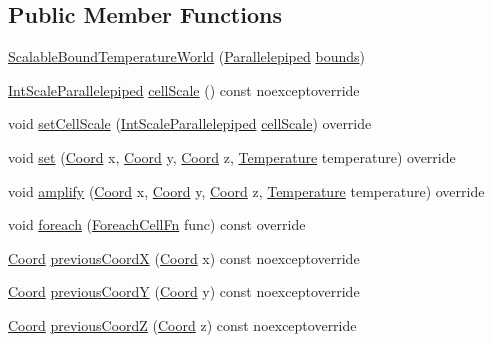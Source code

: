 \subsection*{Public Member Functions}
\begin{DoxyCompactItemize}
\item 
\hyperlink{class_scalable_bound_temperature_world_a70e95f32bc19f298649ac99d0b69068c}{Scalable\-Bound\-Temperature\-World} (\hyperlink{struct_parallelepiped}{Parallelepiped} \hyperlink{class_bound_temperature_world_a3351693a7d184365da5dfb5d833a0cb6}{bounds})
\item 
\hyperlink{struct_int_scale_parallelepiped}{Int\-Scale\-Parallelepiped} \hyperlink{class_scalable_bound_temperature_world_a9ac7291c4a2ff3d60042c518f1ae2858}{cell\-Scale} () const noexceptoverride
\item 
void \hyperlink{class_scalable_bound_temperature_world_addf3187d106391375b4453614a84563b}{set\-Cell\-Scale} (\hyperlink{struct_int_scale_parallelepiped}{Int\-Scale\-Parallelepiped} \hyperlink{class_scalable_bound_temperature_world_a9ac7291c4a2ff3d60042c518f1ae2858}{cell\-Scale}) override
\item 
void \hyperlink{class_scalable_bound_temperature_world_ade4ecf303ae025e824c0bd5ecd2e2ca7}{set} (\hyperlink{struct_coord}{Coord} x, \hyperlink{struct_coord}{Coord} y, \hyperlink{struct_coord}{Coord} z, \hyperlink{struct_temperature}{Temperature} temperature) override
\item 
void \hyperlink{class_scalable_bound_temperature_world_ab9602b36759aa857910e03856344759d}{amplify} (\hyperlink{struct_coord}{Coord} x, \hyperlink{struct_coord}{Coord} y, \hyperlink{struct_coord}{Coord} z, \hyperlink{struct_temperature}{Temperature} temperature) override
\item 
void \hyperlink{class_scalable_bound_temperature_world_a57f60178c88b2cffca11a7f21c5c11c7}{foreach} (\hyperlink{class_i_temperature_world_boundable_mixin_a370c20d79642d15e97843da972d87ba9}{Foreach\-Cell\-Fn} func) const override
\item 
\hyperlink{struct_coord}{Coord} \hyperlink{class_scalable_bound_temperature_world_ac342002bec4e1ac2e7dc6c7a7bd23c76}{previous\-Coord\-X} (\hyperlink{struct_coord}{Coord} x) const noexceptoverride
\item 
\hyperlink{struct_coord}{Coord} \hyperlink{class_scalable_bound_temperature_world_a963106b4d121d29a49f657bac3778980}{previous\-Coord\-Y} (\hyperlink{struct_coord}{Coord} y) const noexceptoverride
\item 
\hyperlink{struct_coord}{Coord} \hyperlink{class_scalable_bound_temperature_world_a4d0a9e96c0a21e53ad8840e42337df64}{previous\-Coord\-Z} (\hyperlink{struct_coord}{Coord} z) const noexceptoverride

\end{DoxyCompactItemize}
